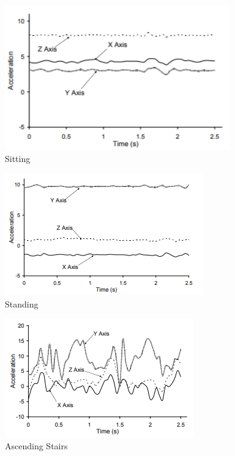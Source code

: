 \documentclass[conference]{IEEEtran}
\begin{document}
\begin{figure}[!htb]
  \includegraphics[width=\linewidth]{sitting.png}
  \caption{Sitting}
  \label{fig:sitting}
\end{figure}
\begin{figure}[!htb]
  \includegraphics[width=\linewidth]{standing.png}
  \caption{Standing}
  \label{fig:standing}
\end{figure}
\begin{figure}[!htb]
  \includegraphics[width=\linewidth]{ascending_stairs.png}
  \caption{Ascending Stairs}
  \label{fig:ascendingStairs}
\end{figure}
\end{document}
